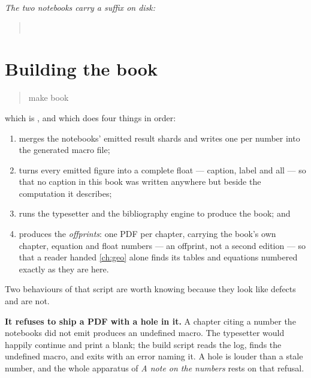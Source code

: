 \noindent\emph{The two  notebooks carry a  suffix on disk:}
\begin{quote}\footnotesize
{}\\
\end{quote}

\section{Building the book}
\label{app:env:build}

\begin{quote}\small\ttfamily
make book
\end{quote}

which is , and which does four things in order:

\begin{enumerate}[leftmargin=*, itemsep=.3em]
  \item merges the notebooks' emitted result shards and writes one 
        per number into the generated macro file;
  \item turns every emitted figure into a complete float --- caption, label and all --- so that no
        caption in this book was written anywhere but beside the computation it describes;
  \item runs the typesetter and the bibliography engine to produce the book; and
  \item produces the \emph{offprints}: one PDF per chapter, carrying the book's own chapter,
        equation and float numbers --- an offprint, not a second edition --- so that a reader
        handed \cref{ch:geo} alone finds its tables and equations numbered exactly as they are
        here.
\end{enumerate}

Two behaviours of that script are worth knowing because they look like defects and are not.

\textbf{It refuses to ship a PDF with a hole in it.} A chapter citing a number the notebooks did
not emit produces an undefined macro. The typesetter would happily continue and print a blank; the
build script reads the log, finds the undefined macro, and exits with an error naming it. A hole is
louder than a stale number, and the whole apparatus of \emph{A note on the numbers} rests on that
refusal.

